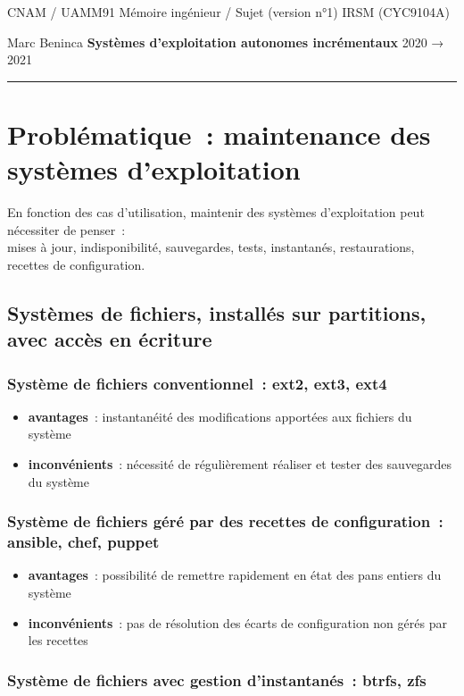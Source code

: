 \documentclass[10pt]{article}
\newcommand{\hr}{\rule{\textwidth}{1pt}}
\newenvironment{itmz}{\begin{itemize}
\setlength{\itemsep}{0em}
}{\end{itemize}}
\begin{document}
CNAM / UAMM91 \hfill Mémoire ingénieur / Sujet (version n°1) \hfill IRSM (CYC9104A)

Marc Beninca \hfill \textbf{Systèmes d’exploitation autonomes incrémentaux} \hfill 2020 → 2021

\hr

\section{Problématique : maintenance des systèmes d’exploitation}

En fonction des cas d’utilisation, maintenir des systèmes d’exploitation peut nécessiter de penser :\\
mises à jour, indisponibilité, sauvegardes, tests, instantanés, restaurations, recettes de configuration.

\subsection{Systèmes de fichiers, installés sur partitions, avec accès en écriture}

\subsubsection{Système de fichiers conventionnel : ext2, ext3, ext4}

\begin{itmz}
\item{\textbf{avantages} : instantanéité des modifications apportées aux fichiers du système}
\item{\textbf{inconvénients} : nécessité de régulièrement réaliser et tester des sauvegardes du système}
\end{itmz}

\subsubsection{Système de fichiers géré par des recettes de configuration : ansible, chef, puppet}

\begin{itmz}
\item{\textbf{avantages} : possibilité de remettre rapidement en état des pans entiers du système}
\item{\textbf{inconvénients} : pas de résolution des écarts de configuration non gérés par les recettes}
\end{itmz}

\subsubsection{Système de fichiers avec gestion d’instantanés : btrfs, zfs}
\end{document}

